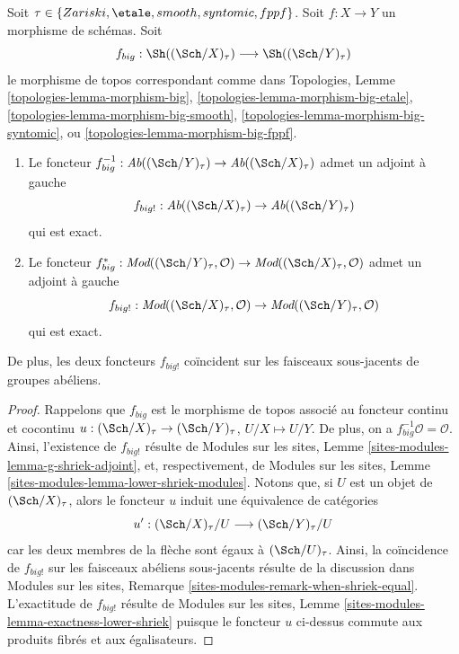 \begin{lemma}
\label{lemma-exactness-lower-shriek}
Soit $\tau \in \{Zariski, \etale, smooth, syntomic, fppf\}$.
Soit $f : X \to Y$ un morphisme de sch\'emas. Soit
$$
f_{big} :
\Sh((\Sch/X)_\tau)
\longrightarrow
\Sh((\Sch/Y)_\tau)
$$
le morphisme de topos correspondant comme dans
Topologies, Lemme
\ref{topologies-lemma-morphism-big},
\ref{topologies-lemma-morphism-big-etale},
\ref{topologies-lemma-morphism-big-smooth},
\ref{topologies-lemma-morphism-big-syntomic}, ou
\ref{topologies-lemma-morphism-big-fppf}.
\begin{enumerate}
\item Le foncteur
$f_{big}^{-1} : \textit{Ab}((\Sch/Y)_\tau) \to \textit{Ab}((\Sch/X)_\tau)$
admet un adjoint \`a gauche
$$
f_{big!} : \textit{Ab}((\Sch/X)_\tau) \to \textit{Ab}((\Sch/Y)_\tau)
$$
qui est exact.
\item Le foncteur
$f_{big}^* :
\textit{Mod}((\Sch/Y)_\tau, \mathcal{O})
\to
\textit{Mod}((\Sch/X)_\tau, \mathcal{O})$
admet un adjoint \`a gauche
$$
f_{big!} :
\textit{Mod}((\Sch/X)_\tau, \mathcal{O})
\to
\textit{Mod}((\Sch/Y)_\tau, \mathcal{O})
$$
qui est exact.
\end{enumerate}
De plus, les deux foncteurs $f_{big!}$ co\"incident sur les faisceaux sous-jacents
de groupes ab\'eliens.
\end{lemma}

\begin{proof}
Rappelons que $f_{big}$ est le morphisme de topos associ\'e au
foncteur continu et cocontinu
$u : (\Sch/X)_\tau \to (\Sch/Y)_\tau$, $U/X \mapsto U/Y$.
De plus, on a $f_{big}^{-1}\mathcal{O} = \mathcal{O}$.
Ainsi, l'existence de $f_{big!}$ r\'esulte de
Modules sur les sites, Lemme \ref{sites-modules-lemma-g-shriek-adjoint},
et, respectivement, de
Modules sur les sites, Lemme \ref{sites-modules-lemma-lower-shriek-modules}.
Notons que, si $U$ est un objet de $(\Sch/X)_\tau$, alors le foncteur
$u$ induit une \'equivalence de cat\'egories
$$
u' :
(\Sch/X)_\tau/U
\longrightarrow
(\Sch/Y)_\tau/U
$$
car les deux membres de la fl\`eche sont \'egaux \`a $(\Sch/U)_\tau$.
Ainsi, la co\"incidence de $f_{big!}$ sur les faisceaux ab\'eliens sous-jacents
r\'esulte de la discussion dans
Modules sur les sites, Remarque \ref{sites-modules-remark-when-shriek-equal}.
L'exactitude de $f_{big!}$ r\'esulte de
Modules sur les sites, Lemme \ref{sites-modules-lemma-exactness-lower-shriek}
puisque le foncteur $u$ ci-dessus commute aux produits fibr\'es et aux \'egalisateurs.
\end{proof}

